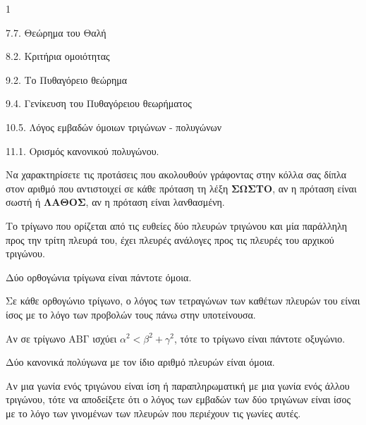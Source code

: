 \begin{ylh}{1}
    \item 7.7. Θεώρημα του Θαλή
    \item 8.2. Κριτήρια ομοιότητας
    \item 9.2. Το Πυθαγόρειο θεώρημα
    \item 9.4. Γενίκευση του Πυθαγόρειου θεωρήματος
    \item 10.5. Λόγος εμβαδών όμοιων τριγώνων - πολυγώνων
    \item 11.1. Ορισμός κανονικού πολυγώνου.
\end{ylh}
\begin{alist}
\item Να χαρακτηρίσετε τις προτάσεις που ακολουθούν γράφοντας στην κόλλα σας δίπλα στον αριθμό που αντιστοιχεί σε κάθε πρόταση τη λέξη \textbf{ΣΩΣΤΟ}, αν η πρόταση είναι σωστή ή \textbf{ΛΑΘΟΣ}, αν η πρόταση είναι λανθασμένη.
    \begin{rlist}
    \item Το τρίγωνο που ορίζεται από τις ευθείες δύο πλευρών τριγώνου και μία παράλληλη προς την τρίτη πλευρά του, έχει πλευρές ανάλογες προς τις πλευρές του αρχικού τριγώνου.
    \item Δύο ορθογώνια τρίγωνα είναι πάντοτε όμοια.
    \item Σε κάθε ορθογώνιο τρίγωνο, ο λόγος των τετραγώνων των καθέτων πλευρών του είναι ίσος με το λόγο των προβολών τους πάνω στην υποτείνουσα.
    \item Αν σε τρίγωνο $\mathrm{AB\Gamma}$ ισχύει $\alpha^2 < \beta^2 + \gamma^2$, τότε το τρίγωνο είναι πάντοτε οξυγώνιο.
    \item Δύο κανονικά πολύγωνα με τον ίδιο αριθμό πλευρών είναι όμοια.
    \end{rlist} 
\item Αν μια γωνία ενός τριγώνου είναι ίση ή παραπληρωματική με μια γωνία ενός άλλου τριγώνου, τότε να αποδείξετε ότι ο λόγος των εμβαδών των δύο τριγώνων είναι ίσος με το λόγο των γινομένων των πλευρών που περιέχουν τις γωνίες αυτές. 
\end{alist}